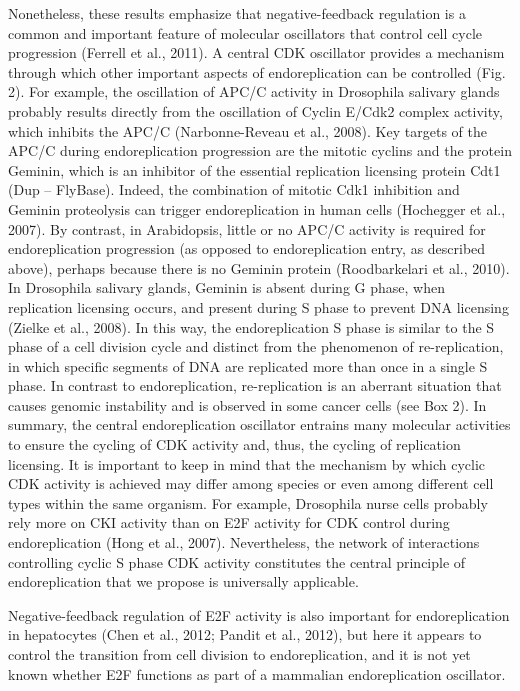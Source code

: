 \documentclass[11pt,twoside,a4paper]{report}
\begin{document}
			Nonetheless, these results emphasize that negative-feedback regulation is a common and important feature of molecular oscillators that control cell cycle progression (Ferrell et al., 2011). A central CDK oscillator provides a mechanism through which other important aspects of endoreplication can be controlled (Fig. 2). 
			For example, the oscillation of APC/C activity in Drosophila salivary glands probably results directly from the oscillation of Cyclin E/Cdk2 complex activity, which inhibits the APC/C (Narbonne-Reveau et al., 2008). Key targets of the APC/C during endoreplication progression are the mitotic cyclins and the protein Geminin, which is an inhibitor of the essential replication licensing protein Cdt1 (Dup – FlyBase).
			Indeed, the combination of mitotic Cdk1 inhibition and Geminin proteolysis can trigger endoreplication in human cells (Hochegger et al., 2007). By contrast, in Arabidopsis, little or no APC/C activity is required for endoreplication progression (as opposed to endoreplication entry, as described above), perhaps because there is no Geminin protein (Roodbarkelari et al., 2010). In Drosophila salivary glands, Geminin is absent during G phase, when replication licensing occurs, and present during S phase to prevent DNA licensing (Zielke et al., 2008).
			 In this way, the endoreplication S phase is similar to the S phase of a cell division cycle and distinct from the phenomenon of re-replication, in which specific segments of DNA are replicated more than once in a single S phase. In contrast to endoreplication, re-replication is an aberrant situation that causes genomic instability and is observed in some cancer cells (see Box 2).
			 In summary, the central endoreplication oscillator entrains many molecular activities to ensure the cycling of CDK activity and, thus, the cycling of replication licensing. It is important to keep in mind that the mechanism by which cyclic CDK activity is achieved may differ among species or even among different cell types within the same organism. For example, Drosophila nurse cells probably rely more on CKI activity than on E2F activity for CDK control during endoreplication (Hong et al., 2007). Nevertheless, the network of interactions controlling cyclic S phase CDK activity constitutes the central principle of endoreplication that we propose is universally applicable.

			Negative-feedback regulation of E2F activity is also important for endoreplication in hepatocytes (Chen et al., 2012; Pandit et al., 2012), but here it appears to control the transition from cell division to endoreplication, and it is not yet known whether E2F functions as part of a mammalian endoreplication oscillator.
			
\end{document}
